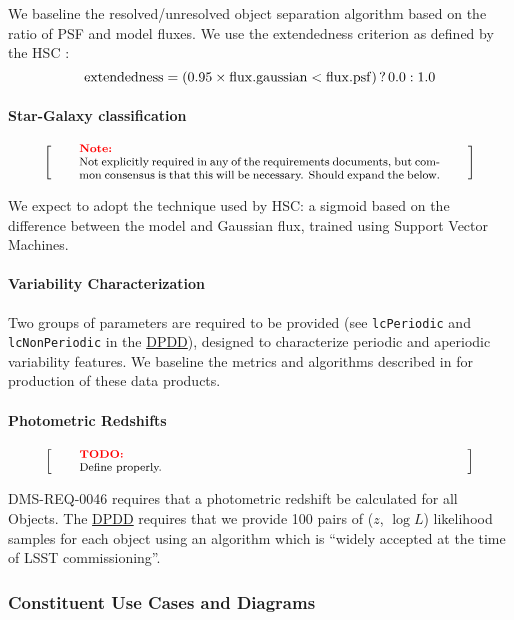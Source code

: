 \documentclass[12pt]{article}
\newcommand{\ds}[2]{{\color{blue} \href{https://docushare.lsstcorp.org/docushare/dsweb/Get/#1}{#2}}\xspace}
\newcommand{\DPDD}{\ds{LSE-163}{DPDD}}
\newenvironment{note}[1][Note]
{
  \begin{displaymath}
    \left[ \qquad
    \begin{minipage}[h]{.75\linewidth}
      \color{red} \footnotesize
      \textbf{#1:} \newline
      \color{black}
}
{
    \end{minipage}
    \normalsize
    \qquad \right]
  \end{displaymath}
}
\begin{document}
We baseline the resolved/unresolved object separation algorithm based on the ratio of PSF and model fluxes. We use the extendedness criterion as defined by the HSC \cite{Furusawa14}:
\begin{equation}
{\rm extendedness} = (0.95\times {\rm flux.gaussian} < {\rm flux.psf})\, ?\, 0.0 : 1.0 \nonumber
\end{equation}

\paragraph{Star-Galaxy classification}

\begin{note}
Not explicitly required in any of the requirements documents, but common consensus is that this will be necessary. Should expand the below.
\end{note}

We expect to adopt the technique used by HSC\@: a sigmoid based on the difference between the model and Gaussian flux, trained using Support Vector Machines.

\paragraph{Variability Characterization}

Two groups of parameters are required to be provided (see {\tt lcPeriodic} and {\tt lcNonPeriodic} in the \DPDD), designed to characterize periodic and aperiodic variability features. We baseline the metrics and algorithms described in \cite{Richards11} for production of these data products.

\paragraph{Photometric Redshifts}

\begin{note}[TODO]
Define properly.
\end{note}

DMS-REQ-0046 requires that a photometric redshift be calculated for all Objects. The \DPDD{} requires that we provide 100 pairs of ($z$, $\log L$) likelihood samples for each object using an algorithm which is ``widely accepted at the time of LSST commissioning''.

\subsubsection{Constituent Use Cases and Diagrams}
\end{document}
